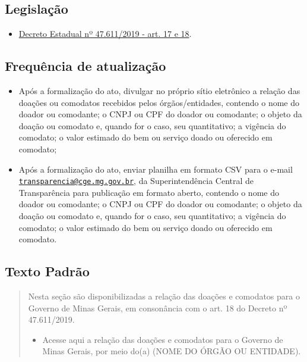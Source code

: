 \documentclass[
]{book}
\providecommand{\tightlist}{%
  \setlength{\itemsep}{0pt}\setlength{\parskip}{0pt}}
\begin{document}
\hypertarget{legislauxe7uxe3o-12}{%
\subsection{Legislação}\label{legislauxe7uxe3o-12}}

\begin{itemize}
\tightlist
\item
  \href{https://www.almg.gov.br/consulte/legislacao/completa/completa.html?tipo=DEC\&num=47611\&comp=\&ano=2019}{Decreto Estadual nº 47.611/2019 - art. 17 e 18}.
\end{itemize}

\hypertarget{frequuxeancia-de-atualizauxe7uxe3o-11}{%
\subsection{Frequência de atualização}\label{frequuxeancia-de-atualizauxe7uxe3o-11}}

\begin{itemize}
\tightlist
\item
  Após a formalização do ato, divulgar no próprio sítio eletrônico a relação das doações ou comodatos recebidos pelos órgãos/entidades, contendo o nome do doador ou comodante; o CNPJ ou CPF do doador ou comodante; o objeto da doação ou comodato e, quando for o caso, seu quantitativo; a vigência do comodato; o valor estimado do bem ou serviço doado ou oferecido em comodato;
\item
  Após a formalização do ato, enviar planilha em formato CSV para o e-mail \href{mailto:transparencia@cge.mg.gov.br}{\nolinkurl{transparencia@cge.mg.gov.br}}, da Superintendência Central de Transparência para publicação em formato aberto, contendo o nome do doador ou comodante; o CNPJ ou CPF do doador ou comodante; o objeto da doação ou comodato e, quando for o caso, seu quantitativo; a vigência do comodato; o valor estimado do bem ou serviço doado ou oferecido em comodato.
\end{itemize}

\hypertarget{texto-padruxe3o-12}{%
\subsection{Texto Padrão}\label{texto-padruxe3o-12}}

\begin{quote}
Nesta seção são disponibilizadas a relação das doações e comodatos para o Governo de Minas Gerais, em consonância com o art. 18 do Decreto nº 47.611/2019.

\begin{itemize}
\tightlist
\item
  Acesse aqui a relação das doações e comodatos para o Governo de Minas Gerais, por meio do(a) (NOME DO ÓRGÃO OU ENTIDADE).
\end{itemize}
\end{quote}
\end{document}
